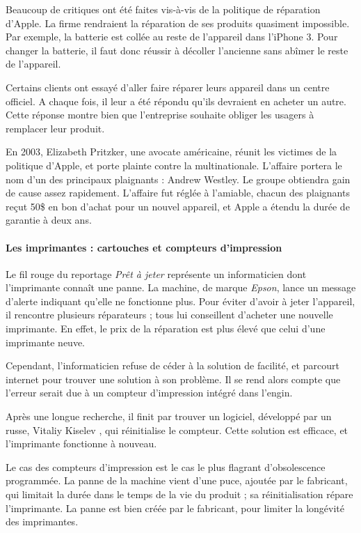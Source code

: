 \smallbreak 

Beaucoup de critiques ont été faites vis-à-vis de la politique de réparation d'Apple. La firme  rendraient la réparation de ses produits quasiment impossible. Par exemple, la batterie est collée au reste de l'appareil dans l'iPhone 3. Pour changer la batterie, il faut donc réussir à décoller l'ancienne sans abîmer le reste de l'appareil.  

Certains clients ont essayé d'aller faire réparer leurs appareil dans un centre officiel. A chaque fois, il leur a été répondu qu'ils devraient en acheter un autre. Cette réponse montre bien que l'entreprise souhaite obliger les usagers à remplacer leur produit. 

\smallbreak


En 2003, Elizabeth Pritzker, une avocate américaine, réunit les victimes de la politique d'Apple, et porte plainte contre la multinationale. L'affaire portera le nom d'un des principaux plaignants : Andrew Westley. Le groupe obtiendra gain de cause assez rapidement. L'affaire fut réglée à l'amiable, chacun des plaignants reçut 50\$ en bon d'achat pour un nouvel appareil, et Apple a étendu la durée de garantie à deux ans. 

\paragraph*{Les imprimantes : cartouches et compteurs d'impression}

Le fil rouge du reportage \textit{Prêt à jeter} représente un informaticien dont l'imprimante connaît une panne. La machine, de marque \textit{Epson}, lance un message d'alerte indiquant qu'elle ne fonctionne plus. Pour éviter d'avoir à jeter l'appareil, il rencontre plusieurs réparateurs ; tous lui conseillent d'acheter une nouvelle imprimante. En effet, le prix de la réparation est plus élevé que celui d'une imprimante neuve. 

Cependant, l'informaticien refuse de céder à la solution de facilité, et parcourt internet pour trouver une solution à son problème. Il se rend alors compte que l'erreur serait due à un compteur d'impression intégré dans l'engin. 

Après une longue recherche, il finit par trouver un logiciel, développé par un russe, Vitaliy Kiselev , qui réinitialise le compteur. Cette solution est efficace, et l'imprimante fonctionne à nouveau.


Le cas des compteurs d'impression est le cas le plus flagrant d'obsolescence programmée. La panne de la machine vient d'une puce, ajoutée par le fabricant, qui limitait la durée dans le temps de la vie du produit ; sa réinitialisation répare l'imprimante. La panne est bien créée par le fabricant, pour limiter la longévité  des imprimantes.

